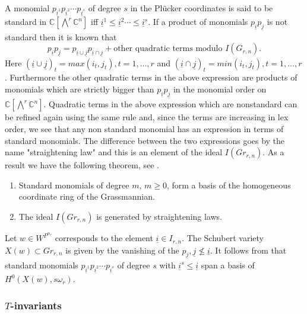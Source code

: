  A monomial $p_{{\underline{i}}^1} p_{{\underline{i}}^2} \cdots p_{{\underline{i}}^s}$ of degree $s$ in the Pl\"{u}cker coordinates is said to be standard in ${\mathbb C}[\bigwedge^r {\mathbb C}^n]$ iff 
 ${\underline{i}}^1 \leq {\underline{i}}^2 \cdots \leq {\underline{i}}^s$.  If a product of monomials $p_{\underline{i}} p_{\underline{j}}$ is not standard then it is known that 
 \[ p_{\underline{i}} p_{\underline{j}} = p_{\underline{i} \cup \underline{j}}p_{\underline{i} \cap \underline{j}} + \text{other quadratic terms\ \ } \text{modulo\ \ }  I(G_{r,n}). \]
 Here $({\underline{i} \cup \underline{j}})_t = max(i_t, j_t), t = 1,\ldots,r$ and  $({\underline{i} \cap \underline{j}})_t = min (i_t, j_t), t = 1,\ldots,r$. 
 Furthermore the other quadratic terms in the above expression are products of monomials which are strictly bigger than $p_{\underline{i}} p_{\underline{j}}$ in the monomial order on ${\mathbb C}[\bigwedge^r {\mathbb C}^n]$. Quadratic terms in the above expression which are nonstandard can be refined again using the same rule and, since the terms are increasing in lex order, we see that any non standard monomial has an expression in terms of standard monomials. The difference between the two expressions goes by the name "straightening law" and this is an element of the ideal $I(Gr_{r,n})$. As a result we have the following theorem, see \cite[Proposition 1.3.6]{seshadriintroduction}.
 
 \begin{theorem} 

\noindent
\begin{enumerate}
 \item Standard monomials of degree $m$, $m \geq 0$, form a basis of the homogeneous coordinate ring of the Grassmannian.
 \item The ideal $I(Gr_{r,n})$ is generated by straightening laws.
 \end{enumerate}
\end{theorem}

Let $w \in W^{P^{\alpha_r}}$ corresponds to the element ${\underline{i}}  \in I_{r,n}$. The Schubert variety $X(w) \subset Gr_{r,n}$ is given by the vanishing of the $p_{\underline{j}}, {\underline{j}} \not \leq  {\underline{i}}$. It follows from \cite[Proposition 1.4.5]{seshadriintroduction} that standard monomials $p_{{\underline{i}}^1} p_{{\underline{i}}^2} \cdots p_{{\underline{i}}^s}$ of degree $s$ with ${\underline{i}}^s \leq {\underline{i}}$ span a basis of $H^0(X(w), s \omega_r)$.


\subsubsection{$T$-invariants}
\label{sec:hb_grass}

